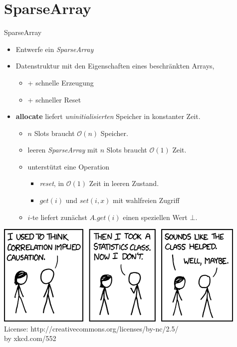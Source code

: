 \documentclass[18pt]{beamer}
\newcommand{\Oh}{\mathcal{O}}
\begin{document}
\section{SparseArray}
\begin{frame}{SparseArray}
\begin{itemize}
 \item 	Entwerfe ein \textit{SparseArray} 
 \item 	Datenstruktur mit den Eigenschaften eines beschränkten Arrays, 
  \begin{itemize}
   \item + schnelle Erzeugung
   \item + schneller Reset
  \end{itemize}
 \item \textbf{allocate} liefert \emph{uninitialisierten} Speicher in konstanter Zeit.
	\begin{itemize}
	\item $n$ Slots braucht $\Oh(n)$ Speicher.
	\item leeren \textit{SparseArray} mit $n$ Slots braucht $\Oh(1)$ Zeit. 
	\item unterstützt eine Operation
	\begin{itemize}
	 \item \textit{reset}, in $\Oh(1)$ Zeit in leeren Zustand.
	 \item $\mathit{get}(i)$ und $\mathit{set}(i,x)$ mit wahlfreien Zugriff
	\end{itemize}
	\item $i$-te liefert zunächst $A.\mathit{get}(i)$ einen speziellen Wert $\bot$.
	\end{itemize}
\end{itemize}
 
\end{frame}



\begin{frame}
\includegraphics[scale=0.7]{correlation} \\
License: http://creativecommons.org/licenses/by-nc/2.5/ \\
by xkcd.com/552
\end{frame}
\end{document}
